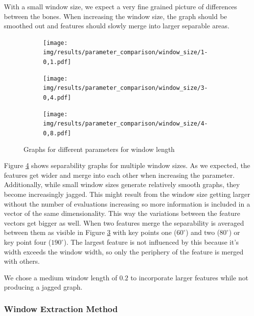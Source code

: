 \documentclass[pdftex,12pt,a4paper]{report}
\begin{document}
With a small window size, we expect a very fine grained picture of differences between the bones. When increasing the window size, the graph should be smoothed out and features should slowly merge into larger separable areas.

\begin{figure}[h]
	\centering
	\begin{subfigure}[b]{0.32\textwidth}
		\centering
		\texttt{[image: img/results/parameter\_comparison/window\_size/1-0,1.pdf]}
		\label{fig:window-size-0}
	\end{subfigure}
	\begin{subfigure}[b]{0.32\textwidth}
		\centering
		\texttt{[image: img/results/parameter\_comparison/window\_size/3-0,4.pdf]}
		\label{fig:window-size-1}
	\end{subfigure}
	\begin{subfigure}[b]{0.32\textwidth}
		\centering
		\texttt{[image: img/results/parameter\_comparison/window\_size/4-0,8.pdf]}
		\label{fig:window-size-2}
	\end{subfigure}
	\caption{Graphs for different parameters for window length}
	\label{fig:window-size}
\end{figure}

Figure \ref{fig:window-size} shows separability graphs for multiple window sizes. As we expected, the features get wider and merge into each other when increasing the parameter. Additionally, while small window sizes generate relatively smooth graphs, they become increasingly jagged. This might result from the window size getting larger without the number of evaluations increasing so more information is included in a vector of the same dimensionality. This way the variations between the feature vectors get bigger as well. When two features merge the separability is averaged between them as visible in Figure \ref{fig:window-size-2} with key points one ($60^\circ$) and two ($80^\circ$) or key point four ($190^\circ$). The largest feature is not influenced by this because it's width exceeds the window width, so only the periphery of the feature is merged with others.

We chose a medium window length of $0.2$ to incorporate larger features while not producing a jagged graph.

\subsubsection{Window Extraction Method}
\end{document}
